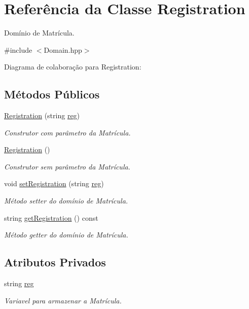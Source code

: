 \hypertarget{classRegistration}{}\section{Referência da Classe Registration}
\label{classRegistration}


Domínio de Matrícula.  




{\ttfamily \#include $<$Domain.\+hpp$>$}



Diagrama de colaboração para Registration\+:
\subsection*{Métodos Públicos}
\begin{DoxyCompactItemize}
\item 
\hyperlink{classRegistration_a2ce7d00addbdb8083d272226dc272e63}{Registration} (string \hyperlink{classRegistration_afb78d65446087c2dd479cebb5b7cc89f}{reg})
\begin{DoxyCompactList}\small\item\em Construtor com parâmetro da Matrícula. \end{DoxyCompactList}\item 
\hyperlink{classRegistration_aac811faf22fe96a7f657a282d6d679ab}{Registration} ()
\begin{DoxyCompactList}\small\item\em Construtor sem parâmetro da Matrícula. \end{DoxyCompactList}\item 
void \hyperlink{classRegistration_af8cb446598b308d73c8fefd63f02a2aa}{set\+Registration} (string \hyperlink{classRegistration_afb78d65446087c2dd479cebb5b7cc89f}{reg})
\begin{DoxyCompactList}\small\item\em Método setter do domínio de Matrícula. \end{DoxyCompactList}\item 
string \hyperlink{classRegistration_a7bfd5b95fa00e3465c625d36b45d9de5}{get\+Registration} () const 
\begin{DoxyCompactList}\small\item\em Método getter do domínio de Matrícula. \end{DoxyCompactList}\end{DoxyCompactItemize}
\subsection*{Atributos Privados}
\begin{DoxyCompactItemize}
\item 
string \hyperlink{classRegistration_afb78d65446087c2dd479cebb5b7cc89f}{reg}\hypertarget{classRegistration_afb78d65446087c2dd479cebb5b7cc89f}{}\label{classRegistration_afb78d65446087c2dd479cebb5b7cc89f}

\begin{DoxyCompactList}\small\item\em Variavel para armazenar a Matrícula. \end{DoxyCompactList}\end{DoxyCompactItemize}


